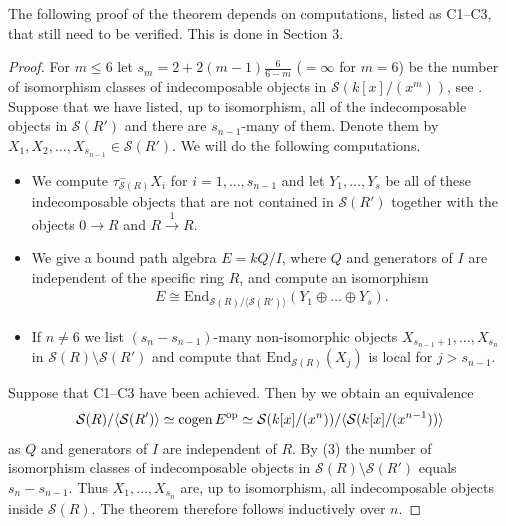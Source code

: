 \documentclass[a4paper]{amsart}
\newcommand{\op}{\textnormal{op}}
\newcommand{\cogen}{\textnormal{cogen}\,}
\numberwithin{equation}{section} \theoremstyle{plain}
\numberwithin{thm}{section}
\begin{document}
The following proof of the theorem depends on computations, listed as C1--C3, that still need to be verified. This is done in Section 3.

\begin{proof} For $m \leq 6$ let $s_m = 2+2(m-1) \frac{6}{6-m}$ ($=\infty$ for $m = 6$) be the number of isomorphism classes of indecomposable objects in $\mathcal{S}(k[x]/(x^m))$, see \cite{RS2}. Suppose that we have listed, up to isomorphism, all of the indecomposable objects in $\mathcal{S}(R')$ and there are $s_{n-1}$-many of them. Denote them by $X_1, X_2, \dots, X_{s_{n-1}} \in \mathcal{S}(R')$. We will do the following computations.
\begin{itemize}
    \item[(C1)] We compute $\tau^-_{\mathcal{S}(R)} X_i$ for $i = 1, \dots, s_{n-1}$ and let $Y_1, \dots, Y_s$ be all of these indecomposable objects that are not contained in $\mathcal{S}(R')$ together with the objects $0 \to R$ and $ R \xrightarrow{1} R$.
    \item[(C2)] We give a bound path algebra $E = kQ/I$, where $Q$ and generators of $I$ are independent of the specific ring $R$, and compute an isomorphism
    \begin{align*}
            E \cong \mathrm{End}_{\mathcal{S}(R)/ \langle \mathcal{S}(R')\rangle} (Y_1 \oplus \dots \oplus Y_s). 
    \end{align*}
    \item[(C3)] If $n \neq 6$ we list $(s_n-s_{n-1})$-many non-isomorphic objects $X_{s_{n-1}+1}, \dots, X_{s_n}$ in $\mathcal{S}(R) \setminus \mathcal{S}(R')$ and compute that $\mathrm{End}_{\mathcal{S}(R)} (X_j)$ is local for $j > s_{n-1}$.
\end{itemize}

Suppose that C1--C3 have been achieved. Then by  we obtain an equivalence 
\begin{align*}
    \mathcal{S}(R)/ \langle \mathcal{S}(R') \rangle \simeq \cogen E^\op \simeq \mathcal{S}(k[x]/(x^n))/ \langle \mathcal{S}(k[x]/(x^{n-1})) \rangle
\end{align*}
as $Q$ and generators of $I$ are independent of $R$. By  (3) the number of isomorphism classes of indecomposable objects in $\mathcal{S}(R) \setminus \mathcal{S}(R')$ equals $s_n-s_{n-1}$. Thus $X_1, \dots, X_{s_n}$ are, up to isomorphism, all indecomposable objects inside $\mathcal{S}(R)$. The theorem therefore follows inductively over $n$.  
\end{proof}
\end{document}
